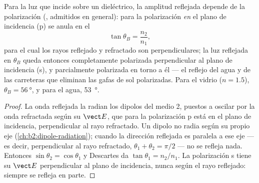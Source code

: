 \begin{proposition}\label{prop:b2:wave-interfaces:brewster}
Para la luz que incide sobre un dieléctrico, la amplitud reflejada depende de
la polarización (, admitidos en general): para la
polarización \emph{en} el plano de incidencia (p) se anula en el
\emph{}
\[
\tan\theta_B = \frac{n_2}{n_1} ,
\]
para el cual los rayos reflejado y refractado son perpendiculares; la luz
reflejada en $\theta_B$ queda entonces completamente polarizada perpendicular al
plano de incidencia (s), y parcialmente polarizada en torno a él --- el reflejo del
agua y de las carreteras que eliminan las gafas de sol polarizadas. Para el vidrio ($n = 1.5$),
$\theta_B = \qty{56}{\degree}$, y para el agua, \qty{53}{\degree}.
\end{proposition}

\begin{proof}
La onda reflejada la radian los dipolos del medio 2, puestos a
oscilar por la onda refractada según su $\vect E$, que para la
polarización p está en el plano de incidencia, perpendicular al
rayo refractado. Un dipolo no radia según su propio eje
(\cref{ch:b2:dipole-radiation}); cuando la dirección reflejada es
paralela a ese eje --- es decir, perpendicular al rayo refractado, $\theta_1
+ \theta_2 = \pi/2$ --- no se refleja nada. Entonces $\sin\theta_2 = \cos\theta_1$ y
Descartes da $\tan\theta_1 = n_2/n_1$. La polarización s tiene su $\vect E$
perpendicular al plano de incidencia, nunca según el rayo
reflejado: siempre se refleja en parte.
\end{proof}

